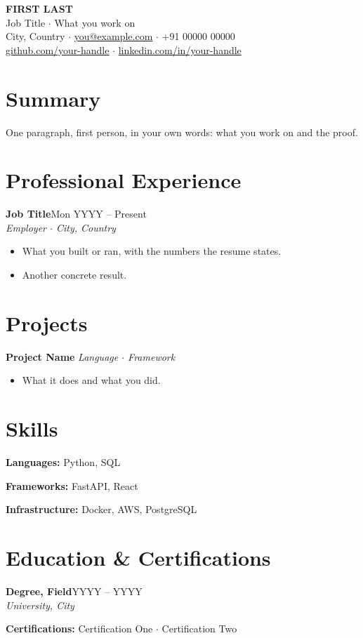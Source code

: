\documentclass[a4paper,9pt]{extarticle}
\newcommand{\role}[3]{%
  \vspace{1pt}
  {\bfseries #1}\hfill{\color{muted}\small #2}\\[1pt]
  {\color{muted}\itshape #3}\par\vspace{2pt}%
}
\newcommand{\tech}[1]{{\footnotesize\itshape\color{muted}#1}}
\begin{document}
\begin{center}
  {\LARGE\bfseries\color{ink} FIRST LAST}\\[3pt]
  {\normalsize\color{muted} Job Title \;$\cdot$\; What you work on}\\[5pt]
  {\small
   City, Country \;$\cdot$\; \href{mailto:you@example.com}{you@example.com} \;$\cdot$\; +91 00000 00000\\[2pt]
   \href{https://github.com/your-handle}{github.com/your-handle} \;$\cdot$\; \href{https://linkedin.com/in/your-handle}{linkedin.com/in/your-handle}}
\end{center}

\section{Summary}
One paragraph, first person, in your own words: what you work on and the proof.

\section{Professional Experience}

\role{Job Title}{Mon YYYY -- Present}{Employer $\cdot$ City, Country}
\begin{itemize}
  \item What you built or ran, with the numbers the resume states.
  \item Another concrete result.
\end{itemize}

\section{Projects}

{\bfseries Project Name}\; \tech{Language \; $\cdot$ \; Framework}\par\vspace{2pt}
\begin{itemize}
  \item What it does and what you did.
\end{itemize}

\section{Skills}
{\bfseries Languages:} Python, SQL\par\vspace{2pt}
{\bfseries Frameworks:} FastAPI, React\par\vspace{2pt}
{\bfseries Infrastructure:} Docker, AWS, PostgreSQL

\section{Education \& Certifications}
{\bfseries Degree, Field}\hfill{\color{muted}\small YYYY -- YYYY}\\[1pt]
{\color{muted}\itshape University, City}\par\vspace{2pt}
{\bfseries Certifications:} Certification One $\cdot$ Certification Two
\end{document}

